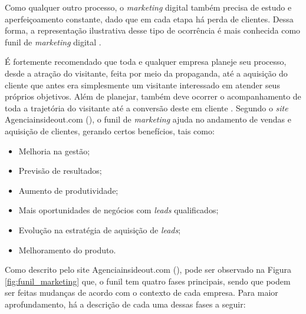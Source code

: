 Como qualquer outro processo, o \textit{marketing} digital também precisa de estudo e aperfeiçoamento constante, dado que em cada etapa há perda de clientes. Dessa forma, a representação ilustrativa desse tipo de ocorrência é mais conhecida como funil de \textit{marketing} digital \cite{BORGES:2017}.

É fortemente recomendado que toda e qualquer empresa planeje seu processo, desde a atração do visitante, feita por meio da propaganda, até a aquisição do cliente que antes era simplesmente um visitante interessado em atender seus próprios objetivos. Além de planejar, também deve ocorrer o acompanhamento de toda a trajetória do visitante até a conversão deste em cliente \cite{INSIDEOUT:2018}.
Segundo o \textit{site} Agenciainsideout.com (\citeyear{INSIDEOUT:2018}), o funil de \textit{marketing} ajuda no andamento de vendas e aquisição de clientes, gerando certos benefícios, tais como:

\begin{itemize}
    \item Melhoria na gestão;
    
    \item Previsão de resultados;
    
    \item Aumento de produtividade;
    
    \item Mais oportunidades de negócios com \textit{leads} qualificados;
    
    \item Evolução na estratégia de aquisição de \textit{leads};
    
    \item Melhoramento do produto.

\end{itemize}

Como descrito pelo site Agenciainsideout.com (\citeyear{INSIDEOUT:2018}), pode ser observado na Figura \ref{fig:funil_marketing} que, o funil tem quatro fases principais, sendo que podem ser feitas mudanças de acordo com o contexto de cada empresa. Para maior aprofundamento, há a descrição de cada uma dessas fases a seguir:

